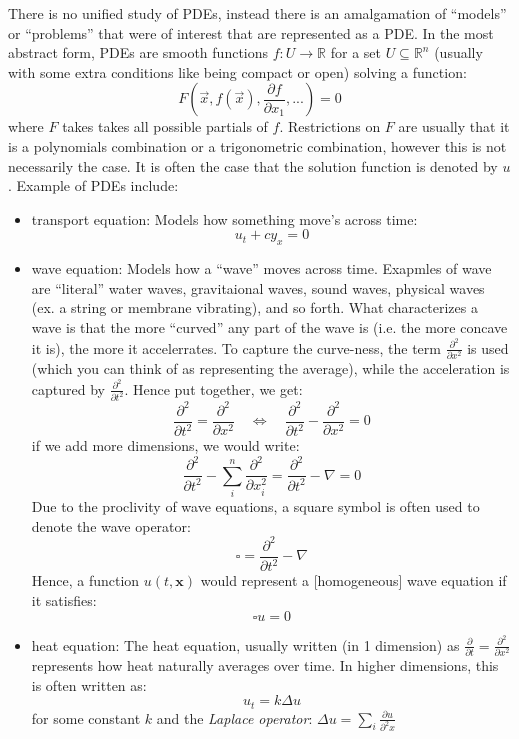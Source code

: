\documentclass{book}
\newcommand{\R}{{\mathbb{R}}}
\newcommand{\sse}{\subseteq}
\renewcommand{\bf}[1]{\textbf{#1}}
\newcommand{\LRw}{\Leftrightarrow}
\begin{document}
There is no unified study of PDEs, instead there is an amalgamation of ``models'' or ``problems'' that were
of interest that are represented as a PDE. In the most abstract form, PDEs are smooth functions $f: U \to \R$ for a
set $U \sse \R^n $ (usually with some extra conditions like being compact or open) solving a function:
\begin{equation}\label{eq:generalPDE}
	F\left(\vec{x}, f(\vec{x}), \frac{\partial f}{\partial x_1}, ...\right) = 0
\end{equation}
where $F$ takes takes all possible partials of $f$. Restrictions on $F$ are usually that it is a polynomials
combination or a trigonometric combination, however this is not necessarily the case. It is often the case
that the solution function is denoted by $u$. Example of PDEs include:

\begin{itemize}
	\item transport equation: Models how something move's across time:
		\[
			u_t + cy_x = 0
		\]
	\item wave equation: Models how a ``wave'' moves across time. Exapmles of wave are ``literal'' water waves,
		gravitaional waves, sound waves, physical waves (ex. a string or membrane vibrating), and so forth. What
		characterizes a wave is that the more ``curved'' any part of the wave is (i.e. the more concave it is), the more
		it accelerrates. To capture the curve-ness, the term $ \frac{\partial^2}{\partial x^2}$ is used (which you can
		think of as representing the average), while the acceleration is captured by $ \frac{\partial^2}{\partial t^2}$.
		Hence put together, we get:
		\[
			\frac{\partial^2}{\partial t^2} = \frac{\partial^2}{\partial x^2} \quad \LRw \quad
			\frac{\partial^2}{\partial t^2} - \frac{\partial^2}{\partial x^2} = 0
		\]
		if we add more dimensions, we would write:
		\[
			\frac{\partial^2}{\partial t^2} - \sum_i^n\frac{\partial^2}{\partial x_i^2} = \frac{\partial^2}{\partial
			t^2} - \nabla = 0
		\]
		Due to the proclivity of wave equations, a square symbol is often used to denote the wave operator:
		\[
			\square = \frac{\partial^2}{\partial t^2} - \nabla
		\]
		Hence, a function $u(t, \bf{x})$ would represent a [homogeneous] wave equation if it satisfies:
		\[
			\square u = 0
	\]
	\item heat equation: The heat equation, usually written (in 1 dimension) as $ \frac{\partial }{\partial t} = \frac{\partial^2
		}{\partial x^2}$ represents how heat naturally averages over time. In higher dimensions, this is often
		written as:
		\[
			u_t = k\Delta u
		\]
		for some constant $k$ and the \emph{Laplace operator}: $\Delta u = \sum_i \frac{\partial u}{\partial^2
		x}$


\end{itemize}
\end{document}
